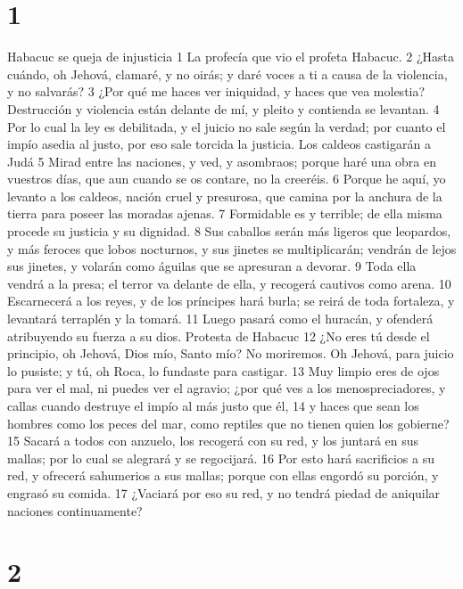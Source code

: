 
\chapter{1}

Habacuc se queja de injusticia
1 La profecía que vio el profeta Habacuc.
2 ¿Hasta cuándo, oh Jehová, clamaré, y no oirás; y daré voces a ti a causa de la violencia, y no salvarás?
3 ¿Por qué me haces ver iniquidad, y haces que vea molestia? Destrucción y violencia están delante de mí, y pleito y contienda se levantan.
4 Por lo cual la ley es debilitada, y el juicio no sale según la verdad; por cuanto el impío asedia al justo, por eso sale torcida la justicia.
Los caldeos castigarán a Judá
5 Mirad entre las naciones, y ved, y asombraos; porque haré una obra en vuestros días, que aun cuando se os contare, no la creeréis. 
6 Porque he aquí, yo levanto a los caldeos, nación cruel y presurosa, que camina por la anchura de la tierra para poseer las moradas ajenas.
7 Formidable es y terrible; de ella misma procede su justicia y su dignidad.
8 Sus caballos serán más ligeros que leopardos, y más feroces que lobos nocturnos, y sus jinetes se multiplicarán; vendrán de lejos sus jinetes, y volarán como águilas que se apresuran a devorar.
9 Toda ella vendrá a la presa; el terror va delante de ella, y recogerá cautivos como arena.
10 Escarnecerá a los reyes, y de los príncipes hará burla; se reirá de toda fortaleza, y levantará terraplén y la tomará.
11 Luego pasará como el huracán, y ofenderá atribuyendo su fuerza a su dios.
Protesta de Habacuc
12 ¿No eres tú desde el principio, oh Jehová, Dios mío, Santo mío? No moriremos. Oh Jehová, para juicio lo pusiste; y tú, oh Roca, lo fundaste para castigar.
13 Muy limpio eres de ojos para ver el mal, ni puedes ver el agravio; ¿por qué ves a los menospreciadores, y callas cuando destruye el impío al más justo que él,
14 y haces que sean los hombres como los peces del mar, como reptiles que no tienen quien los gobierne?
15 Sacará a todos con anzuelo, los recogerá con su red, y los juntará en sus mallas; por lo cual se alegrará y se regocijará.
16 Por esto hará sacrificios a su red, y ofrecerá sahumerios a sus mallas; porque con ellas engordó su porción, y engrasó su comida.
17 ¿Vaciará por eso su red, y no tendrá piedad de aniquilar naciones continuamente?

\chapter{2}

